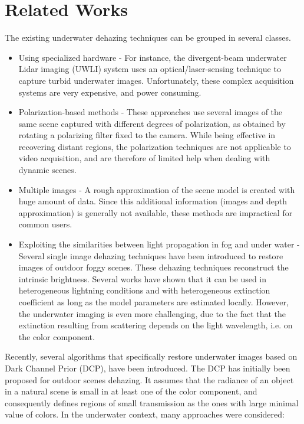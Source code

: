 \documentclass[hidelinks, 12pt]{report}
\begin{document}
\section{Related Works}
\justify
The existing underwater dehazing techniques can be grouped in several classes. 
\begin{itemize}
\item{Using specialized hardware - For instance, the divergent-beam underwater Lidar imaging (UWLI) system uses an optical/laser-sensing technique to capture turbid underwater images. Unfortunately, these complex acquisition systems are very expensive, and power consuming.}
\item{Polarization-based methods - These approaches use several images of the same scene captured with different degrees of polarization, as obtained by rotating a polarizing filter fixed to the camera. While being effective in recovering distant regions, the polarization techniques are not applicable to video acquisition, and are therefore of limited help when dealing with dynamic scenes.}
\item{Multiple images - A rough approximation of the scene model is created with huge amount of data. Since this additional information (images and depth approximation) is generally not available, these methods are impractical for common users.}
\item{Exploiting the similarities between light propagation in fog and under water - Several single image dehazing techniques have been introduced to restore images of outdoor foggy scenes. These dehazing techniques reconstruct the intrinsic brightness. Several works have shown that it can be used in heterogeneous lightning conditions and with heterogeneous extinction coefficient as long as the model parameters are estimated locally. However, the underwater imaging is even more challenging, due to the fact that the extinction resulting from scattering depends on the light wavelength, i.e. on the color component.}
\end{itemize} \par
Recently, several algorithms that specifically restore underwater images based on Dark Channel Prior (DCP), have been introduced. The DCP has initially been proposed for outdoor scenes dehazing. It assumes that the radiance of an object in a natural scene is small in at least one of the color component, and consequently defines regions of small transmission as the ones with large minimal value of colors. In the underwater context, many approaches were considered:
\end{document}
